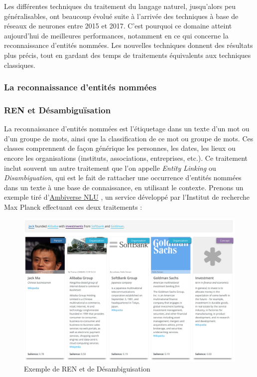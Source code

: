 Les différentes techniques du traitement du langage naturel, jusqu'alors peu généralisables, ont beaucoup évolué suite à l'arrivée des techniques à base de réseaux de neurones entre 2015 et 2017. C'est pourquoi ce domaine atteint aujourd'hui de meilleures performances, notamment en ce qui concerne la reconnaissance d'entités nommées. Les nouvelles techniques donnent des résultats plus précis, tout en gardant des temps de traitements équivalents aux techniques classiques.
\label{section 2.1.1}

\subsubsection{La reconnaissance d'entités nommées}

\subsubsection*{REN et Désambiguïsation}
La reconnaissance d'entités nommées est l'étiquetage dans un texte d'un mot ou d'un groupe de mots, ainsi que la classification de ce mot ou groupe de mots. Ces classes comprennent de façon générique les personnes, les dates, les lieux ou encore les organisations (instituts, associations, entreprises, etc.). Ce traitement inclut souvent un autre traitement que l'on appelle \textit{Entity Linking} ou \textit{Disambiguation}, qui est le fait de rattacher une occurrence d'entités nommées dans un texte à une base de connaissance, en utilisant le contexte. Prenons un exemple tiré d'\href{https://ambiversenlu.mpi-inf.mpg.de/}{Ambiverse NLU} \cite{ambiverse-nlu}, un service développé par l'Institut de recherche Max Planck effectuant ces deux traitements :
\newline

\begin{figure}[H]
    \centering
    \includegraphics[scale=0.24]{images/ner-demo.png}
    \caption{Exemple de REN et de Désambiguisation}
    \label{fig:ner-demo}
\end{figure}

